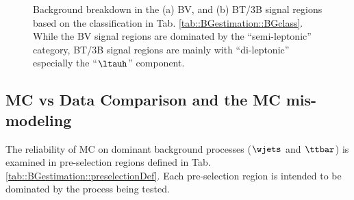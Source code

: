 \clearpage
\begin{figure}[h]
  \centering
    \caption{ Background breakdown in the (a) BV, and (b) BT/3B signal regions based on the classification in Tab. \ref{tab::BGestimation::BGclass}. While the BV signal regions are dominated by the ``semi-leptonic'' category, BT/3B signal regions are mainly with ``di-leptonic'' especially the ``$\ltauh$'' component.
 \label{fig::BGestimation::BGcomposition_objRep} }
\end{figure}


\clearpage

\subsection{MC vs Data Comparison and the MC mis-modeling} \label{sec::BGestimation::dataMC}
The reliability of MC on dominant background processes ($\wjets$ and $\ttbar$) is examined in pre-selection regions defined in Tab.\ref{tab::BGestimation::preselectionDef}. Each pre-selection region is intended to be dominated by the process being tested. 

